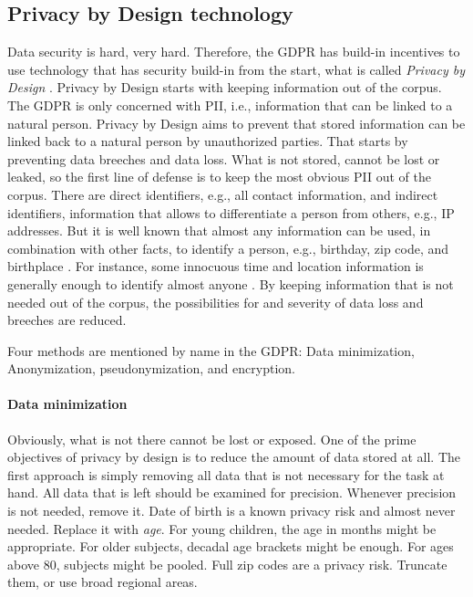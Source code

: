 \documentclass[10pt, a4paper]{article}
\begin{document}
\subsection{Privacy by Design technology}

Data security is hard, very hard. Therefore, the GDPR has build-in incentives to use technology that has security build-in from the start, what is called \emph{Privacy by Design} \cite{IAPP2016Top10,AnitaVocht2016,AllenOvery2016GDPR,ico2017Overview}. Privacy by Design starts with keeping information out of the corpus. The GDPR is only concerned with PII, i.e., information that can be linked to a natural person. Privacy by Design aims to prevent that stored information can be linked back to a natural person by unauthorized parties. That starts by preventing data breeches and data loss. What is not stored, cannot be lost or leaked, so the first line of defense is to keep the most obvious PII out of the corpus. There are direct identifiers, e.g., all contact information, and indirect identifiers, information that allows to differentiate a person from others, e.g., IP addresses. But it is well known that almost any information can be used, in combination with other facts, to identify a person, e.g., birthday, zip code, and birthplace \cite{sweeney2000simple}. For instance, some innocuous time and location information is generally enough to identify almost anyone \cite{de2013unique}. By keeping information that is not needed out of the corpus, the possibilities for and severity of data loss and breeches are reduced.

\noindent Four methods are mentioned by name in the GDPR: Data minimization, Anonymization, pseudonymization, and encryption. 

\paragraph{Data minimization} Obviously, what is not there cannot be lost or exposed. One of the prime objectives of privacy by design is to reduce the amount of data stored at all. The first approach is simply removing all data that is not necessary for the task at hand. All data that is left should be examined for precision. Whenever precision is not needed, remove it. Date of birth is a known privacy risk and almost never needed. Replace it with {\em age}. For young children, the age in months might be appropriate. For older subjects, decadal age brackets might be enough. For ages above 80, subjects might be pooled. Full zip codes are a privacy risk. Truncate them, or use broad regional areas.
\end{document}
